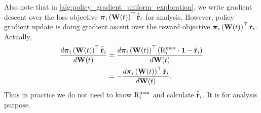 Also note that in \cref{alg:policy_gradient_uniform_exploration}, we write gradient descent over the loss objective  ${\boldsymbol{\pi}}_{i}\left({\mathbf{W}}(t)\right)^\top \hat{{\tilde{\mathbf{r}}}}_i$ for analysis. However, policy gradient update is doing gradient ascent over the reward objective ${\boldsymbol{\pi}}_{i}\left({\mathbf{W}}(t)\right)^\top {\hat{\mathbf{r}}}_i$. Actually,
\begin{equation*}
\begin{split}
    \frac{d{\boldsymbol{\pi}}_{i}\left({\mathbf{W}}(t)\right)^\top \hat{{\tilde{\mathbf{r}}}}_i}{d {\mathbf{W}}(t)} &= \frac{d{\boldsymbol{\pi}}_{i}\left({\mathbf{W}}(t)\right)^\top \left( {\text{R}}_i^{\max} \cdot {\mathbf{1}} - {\hat{\mathbf{r}}}_i \right)}{d {\mathbf{W}}(t)} \\
    &= - \frac{d{\boldsymbol{\pi}}_{i}\left({\mathbf{W}}(t)\right)^\top {\hat{\mathbf{r}}}_i}{d {\mathbf{W}}(t)}.
\end{split}
\end{equation*}
Thus in practice we do not need to know ${\text{R}}_i^{\max}$ and calculate $\hat{{\tilde{\mathbf{r}}}}_i$. It is for analysis purpose.

